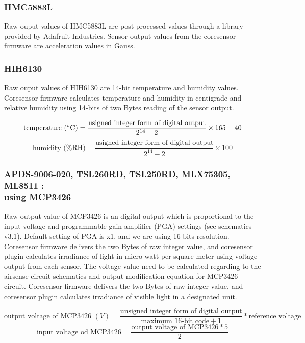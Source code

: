\subsubsection{ HMC5883L}

Raw ouput values of HMC5883L are post-processed values through a library provided by Adafruit Industries. Sensor output values from the coresensor firmware are acceleration values in Gauss.

\subsubsection{ HIH6130}

Raw ouput values of HIH6130 are 14-bit temperature and humidity values. Coresensor firmware calculates temperature and humidity in centigrade and relative humidity using 14-bits of two Bytes reading of the sensor output.

{\centering
 \[ \text{temperature (\degree C)} = \frac{\text{usigned integer form of digital output}}{2^{14} - 2} \times 165 - 40 \] 
 \[ \text{humidity (\%RH)} = \frac{\text{usigned integer form of digital output}}{2^{14} - 2} \times 100 \]
 \par
 }


\subsubsection[MCP3426]{ APDS-9006-020, TSL260RD, TSL250RD, MLX75305, ML8511 : \\ using MCP3426}

Raw output value of MCP3426 is an digital output which is proportional to the input voltage and programmable gain amplifier (PGA) settings (see schematics v3.1). Default setting of PGA is x1, and we are using 16-bits resolution. Coresensor firmware delivers the two Bytes of raw integer value, and coresensor plugin calculates irradiance of light in micro-watt per square meter using voltage output from each sensor. The voltage value need to be calculated regarding to the airsense circuit schematics and output modification equation for MCP3426 circuit. Coresensor firmware delivers the two Bytes of raw integer value, and coresensor plugin calculates irradiance of visible light in a designated unit.

{\centering
 \[ \text{output voltage of MCP3426 }(V) = \frac{\text{unsigned integer form of digital output}}{\text{maximum 16-bit code} + 1} * \text{reference voltage} \]
 \[ \text{input voltage od MCP3426} = \frac{\text{output voltage of MCP3426} * 5}{2} \]
 \par
 }

